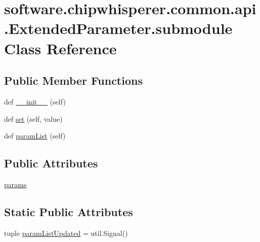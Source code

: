 \hypertarget{classsoftware_1_1chipwhisperer_1_1common_1_1api_1_1ExtendedParameter_1_1submodule}{}\section{software.\+chipwhisperer.\+common.\+api.\+Extended\+Parameter.\+submodule Class Reference}
\label{classsoftware_1_1chipwhisperer_1_1common_1_1api_1_1ExtendedParameter_1_1submodule}
\subsection*{Public Member Functions}
\begin{DoxyCompactItemize}
\item 
def \hyperlink{classsoftware_1_1chipwhisperer_1_1common_1_1api_1_1ExtendedParameter_1_1submodule_ac5be6d70e15f75ada857ceaad6032509}{\+\_\+\+\_\+init\+\_\+\+\_\+} (self)
\item 
def \hyperlink{classsoftware_1_1chipwhisperer_1_1common_1_1api_1_1ExtendedParameter_1_1submodule_a66aace935b29bf4b9d674ab2cc8299f8}{set} (self, value)
\item 
def \hyperlink{classsoftware_1_1chipwhisperer_1_1common_1_1api_1_1ExtendedParameter_1_1submodule_a8e0e7dad6854d8fd82cf6caf89ef2692}{param\+List} (self)
\end{DoxyCompactItemize}
\subsection*{Public Attributes}
\begin{DoxyCompactItemize}
\item 
\hyperlink{classsoftware_1_1chipwhisperer_1_1common_1_1api_1_1ExtendedParameter_1_1submodule_aed67fc3a0e1ad3bfe2ac4445a7d4c54c}{params}
\end{DoxyCompactItemize}
\subsection*{Static Public Attributes}
\begin{DoxyCompactItemize}
\item 
tuple \hyperlink{classsoftware_1_1chipwhisperer_1_1common_1_1api_1_1ExtendedParameter_1_1submodule_a02d315e3ee5282309c002f2442904b5f}{param\+List\+Updated} = util.\+Signal()
\end{DoxyCompactItemize}


